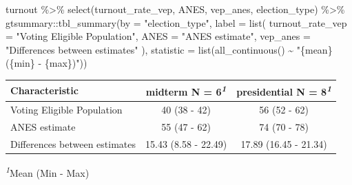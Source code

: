 \documentclass[
  letterpaper,
  DIV=11,
  numbers=noendperiod]{scrartcl}
\newenvironment{Shaded}{\begin{snugshade}}{\end{snugshade}}
\newcommand{\AttributeTok}[1]{\textcolor[rgb]{0.40,0.45,0.13}{#1}}
\newcommand{\FunctionTok}[1]{\textcolor[rgb]{0.28,0.35,0.67}{#1}}
\newcommand{\NormalTok}[1]{\textcolor[rgb]{0.00,0.23,0.31}{#1}}
\newcommand{\SpecialCharTok}[1]{\textcolor[rgb]{0.37,0.37,0.37}{#1}}
\newcommand{\StringTok}[1]{\textcolor[rgb]{0.13,0.47,0.30}{#1}}
\begin{document}
\begin{Shaded}
\begin{Highlighting}[]
\NormalTok{turnout }\SpecialCharTok{\%\textgreater{}\%} 
  \FunctionTok{select}\NormalTok{(turnout\_rate\_vep, ANES, vep\_anes, election\_type) }\SpecialCharTok{\%\textgreater{}\%} 
\NormalTok{  gtsummary}\SpecialCharTok{::}\FunctionTok{tbl\_summary}\NormalTok{(}\AttributeTok{by =} \StringTok{"election\_type"}\NormalTok{,}
                         \AttributeTok{label =} \FunctionTok{list}\NormalTok{(}
                           \AttributeTok{turnout\_rate\_vep =} \StringTok{"Voting Eligible Population"}\NormalTok{,}
                           \AttributeTok{ANES =} \StringTok{"ANES estimate"}\NormalTok{,}
                           \AttributeTok{vep\_anes =} \StringTok{"Differences between estimates"}
\NormalTok{                         ),}
                         \AttributeTok{statistic =} \FunctionTok{list}\NormalTok{(}\FunctionTok{all\_continuous}\NormalTok{() }\SpecialCharTok{\textasciitilde{}} \StringTok{"\{mean\} (\{min\} {-} \{max\})"}\NormalTok{))}
\end{Highlighting}
\end{Shaded}

\begingroup
\fontsize{12.0pt}{14.4pt}\selectfont
\setlength{\LTpost}{0mm}
\begin{longtable*}{lcc}
\toprule
\textbf{Characteristic} & \textbf{midterm}  N = 6\textsuperscript{\textit{1}} & \textbf{presidential}  N = 8\textsuperscript{\textit{1}} \\ 
\midrule\addlinespace[2.5pt]
Voting Eligible Population & 40 (38 - 42) & 56 (52 - 62) \\ 
ANES estimate & 55 (47 - 62) & 74 (70 - 78) \\ 
Differences between estimates & 15.43 (8.58 - 22.49) & 17.89 (16.45 - 21.34) \\ 
\bottomrule
\end{longtable*}
\begin{minipage}{\linewidth}
\textsuperscript{\textit{1}}Mean (Min - Max)\\
\end{minipage}
\endgroup
\end{document}
